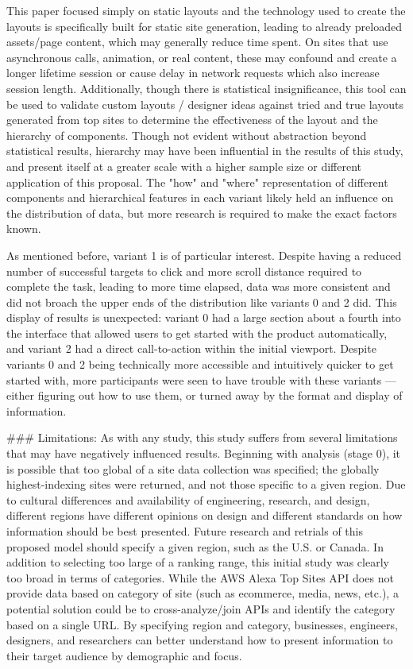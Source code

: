 This paper focused simply on static layouts and the technology used to create the layouts is specifically built for static site generation, leading to already preloaded assets/page content, which may generally reduce time spent. On sites that use asynchronous calls, animation, or real content, these may confound and create a longer lifetime session or cause delay in network requests which also increase session length.
Additionally, though there is statistical insignificance, this tool can be used to validate custom layouts / designer ideas against tried and true layouts generated from top sites to determine the effectiveness of the layout and the hierarchy of components. Though not evident without abstraction beyond statistical results, hierarchy may have been influential in the results of this study, and present itself at a greater scale with a higher sample size or different application of this proposal. The "how" and "where" representation of different components and hierarchical features in each variant likely held an influence on the distribution of data, but more research is required to make the exact factors known.

As mentioned before, variant 1 is of particular interest. Despite having a reduced number of successful targets to click and more scroll distance required to complete the task, leading to more time elapsed, data was more consistent and did not broach the upper ends of the distribution like variants 0 and 2 did. This display of results is unexpected: variant 0 had a large section about a fourth into the interface that allowed users to get started with the product automatically, and variant 2 had a direct call-to-action within the initial viewport. Despite variants 0 and 2 being technically more accessible and intuitively quicker to get started with, more participants were seen to have trouble with these variants — either figuring out how to use them, or turned away by the format and display of information.

### Limitations:
As with any study, this study suffers from several limitations that may have negatively influenced results. Beginning with analysis (stage 0), it is possible that too global of a site data collection was specified; the globally highest-indexing sites were returned, and not those specific to a given region. Due to cultural differences and availability of engineering, research, and design, different regions have different opinions on design and different standards on how information should be best presented. Future research and retrials of this proposed model should specify a given region, such as the U.S. or Canada. In addition to selecting too large of a ranking range, this initial study was clearly too broad in terms of categories. While the AWS Alexa Top Sites API does not provide data based on category of site (such as ecommerce, media, news, etc.), a potential solution could be to cross-analyze/join APIs and identify the category based on a single URL. By specifying region and category, businesses, engineers, designers, and researchers can better understand how to present information to their target audience by demographic and focus.

